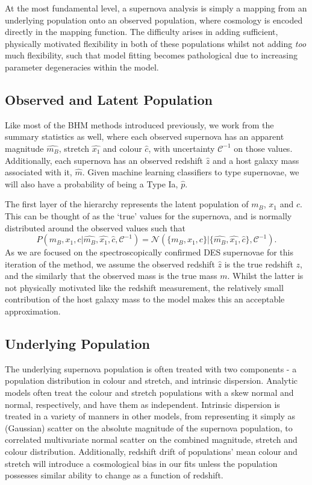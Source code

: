 \documentclass[a4paper,fleqn,usenatbib]{mnras}
\newcommand{\cov}{\mathcal{C}^{-1}}
\begin{document}
At the most fundamental level, a supernova analysis is simply a mapping from an underlying population onto an observed population, where cosmology is encoded directly in the mapping function. The difficulty arises in adding sufficient, physically motivated flexibility in both of these populations whilst not adding \textit{too} much flexibility, such that model fitting becomes pathological due to increasing parameter degeneracies within the model.

\subsection{Observed and Latent Population}

Like most of the BHM methods introduced previously, we work from the summary statistics as well, where each observed supernova has an apparent magnitude $\hat{m_B}$, stretch $\hat{x_1}$ and colour $\hat{c}$, with uncertainty $\cov$ on those values. Additionally, each supernova has an observed redshift $\hat{z}$ and a host galaxy mass associated with it, $\hat{m}$. Given machine learning classifiers to type supernovae, we will also have a probability of being a Type Ia, $\hat{p}$.

The first layer of the hierarchy represents the latent population of $m_B$, $x_1$ and $c$. This can be thought of as the `true' values for the supernova, and is normally distributed around the observed values such that 
\begin{equation}
P(m_B, x_1, c|\hat{m_B},\hat{x_1},\hat{c},\cov) = \mathcal{N}(\lbrace m_B, x_1, c \rbrace|\lbrace \hat{m_B},\hat{x_1},\hat{c} \rbrace, \cov).
\end{equation}
As we are focused on the spectroscopically confirmed DES supernovae for this iteration of the method, we assume the observed redshift $\hat{z}$ is the true redshift $z$, and the similarly that the observed mass is the true mass $m$. Whilst the latter is not physically motivated like the redshift measurement, the relatively small contribution of the host galaxy mass to the model makes this an acceptable approximation.

\subsection{Underlying Population}

The underlying supernova population is often treated with two components - a population distribution in colour and stretch, and intrinsic dispersion. Analytic models often treat the colour and stretch populations with a skew normal and normal, respectively, and have them as independent. Intrinsic dispersion is treated in a variety of manners in other models, from representing it simply as (Gaussian) scatter on the absolute magnitude of the supernova population, to correlated multivariate normal scatter on the combined magnitude, stretch and colour distribution. Additionally, redshift drift of populations' mean colour and stretch will introduce a cosmological bias in our fits unless the population possesses similar ability to change as a function of redshift. 
\end{document}

